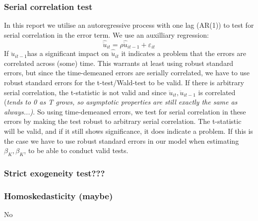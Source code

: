\subsubsection*{Serial correlation test}
In this report we utilise an autoregressive process with one lag (AR(1)) to test for serial correlation in the error term. We use an auxilliary regression:
\begin{equation*}
    \hat{\ddot{u}}_{it}=\rho \hat{\ddot{u}}_{it-1}+\varepsilon_{it}
\end{equation*}
If $\hat{\ddot{u}}_{it-1}$has a significant impact on $\hat{\ddot{u}}_{it}$ it indicates a problem that the errors are correlated across (some) time. This warrants at least using robust standard errors, but since the time-demeaned errors are serially correlated, we have to use robust standard errors for the t-test/Wald-test to be valid. If there is arbitrary serial correlation, the t-statistic is not valid and since $\ddot{u}_{it},\ddot{u}_{it-1}$ is correlated (\textit{tends to 0 as T grows, so asymptotic properties are still exactly the same as always...)}. So using time-demeaned errors, we test for serial correlation in these errors by making the test robust to arbitrary serial correlation. The t-statistic will be valid, and if it still shows significance, it does indicate a problem. If this is the case we have to use robust standard errors in our model when estimating $\beta_K,\beta_K$, to be able to conduct valid tests.

\subsubsection*{Strict exogeneity test???}


\subsubsection*{Homoskedasticity (maybe)}
No
